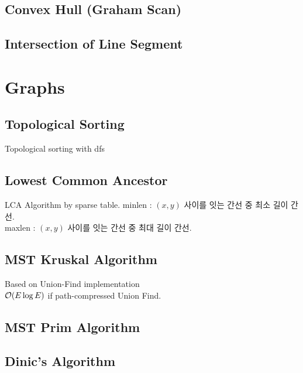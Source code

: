 \documentclass[landscape,8pt]{article}
\begin{document}
\begin{multicols}{2}
  \subsection{Convex Hull (Graham Scan)}
    
  \subsection{Intersection of Line Segment}
    
\columnbreak

\section{Graphs}
  \subsection{Topological Sorting}
  Topological sorting with dfs
    

  \subsection{Lowest Common Ancestor}
  LCA Algorithm by sparse table.
  minlen : $(x, y)$ 사이를 잇는 간선 중 최소 길이 간선. \\
  maxlen : $(x, y)$ 사이를 잇는 간선 중 최대 길이 간선.
    

  \subsection{MST Kruskal Algorithm}
  Based on Union-Find implementation\\
  $\order{E \log E}$ if path-compressed Union Find.
    

  \subsection{MST Prim Algorithm}
    


  \subsection{Dinic's Algorithm}
    


\end{multicols}
\end{document}
